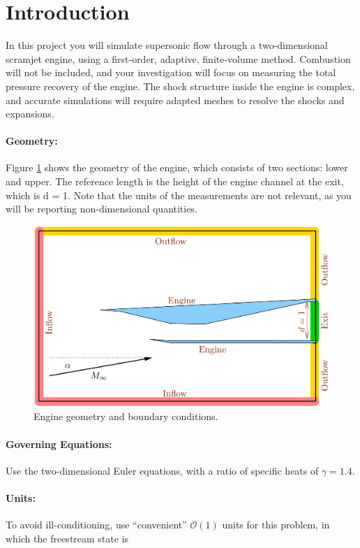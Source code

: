 \pagebreak
\section{Introduction}
In this project you will simulate supersonic flow through a two-dimensional scramjet engine, using a first-order, adaptive, finite-volume method. Combustion will not be included, and your investigation will focus on measuring the total pressure recovery of the engine. The shock structure inside the engine is complex, and accurate simulations will require adapted meshes to resolve the shocks and expansions.

\paragraph{Geometry:} Figure \ref{fig:engine_geometry} shows the geometry of the engine, which consists of two sections: lower and upper. The reference length is the height of the engine channel at the exit, which is d = 1. Note that the units of the measurements are not relevant, as you will be reporting non-dimensional quantities.

\begin{figure}[h]
    \centering
    \includegraphics[width = 0.75\linewidth]{admin/engine_geometry.png}
    \caption[Engine Geometry and Boundary Conditions]{Engine geometry and boundary conditions.}
    \label{fig:engine_geometry}
\end{figure}

\paragraph{Governing Equations:} Use the two-dimensional Euler equations, with a ratio of specific heats of $\gamma = 1.4$.

\paragraph{Units:} To avoid ill-conditioning, use ``convenient'' $\mathcal{O}(1)$ units for this problem, in which the freestream state is

